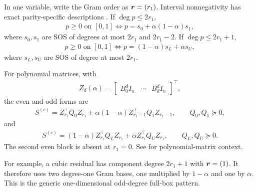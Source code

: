 In one variable, write the Gram order as $\boldsymbol{r}=(r_1)$. Interval nonnegativity has exact parity-specific descriptions \cite{lukacs1918,deklerkhesslaurent2017}. If $\deg p\le2r_1$,
\begin{gather*}
p\ge0\text{ on }[0,1]
  \Longleftrightarrow
  p=s_0+\alpha(1-\alpha)s_1,
\end{gather*}
where $s_0,s_1$ are SOS of degrees at most $2r_1$ and $2r_1-2$. If $\deg p\le2r_1+1$,
\begin{gather*}
p\ge0\text{ on }[0,1]
  \Longleftrightarrow
  p=(1-\alpha)s_L+\alpha s_U,
\end{gather*}
where $s_L,s_U$ are SOS of degree at most $2r_1$.

For polynomial matrices, with
\begin{gather*}
  Z_d(\alpha)=
  \begin{bmatrix}B_0^dI_n&\cdots&B_d^dI_n\end{bmatrix}^\top,
\end{gather*}
the even and odd forms are
\begin{gather*}
  S^{(c)}=Z_{r_1}^\top Q_0Z_{r_1}
   +\alpha(1-\alpha)Z_{r_1-1}^\top Q_1Z_{r_1-1},
  \qquad Q_0,Q_1\succeq0,
\end{gather*}
and
\begin{gather*}
  S^{(c)}=(1-\alpha)Z_{r_1}^\top Q_LZ_{r_1}
    +\alpha Z_{r_1}^\top Q_UZ_{r_1},
  \qquad Q_L,Q_U\succeq0.
\end{gather*}
The second even block is absent at $r_1=0$. See \cite{aylwarditaniparrilo2007,schererhol2006} for polynomial-matrix context.

For example, a cubic residual has component degree $2r_1+1$ with $\boldsymbol{r}=(1)$. It therefore uses two degree-one Gram bases, one multiplied by $1-\alpha$ and one by $\alpha$. This is the generic one-dimensional odd-degree full-box pattern.

\begin{center}
\end{center}

